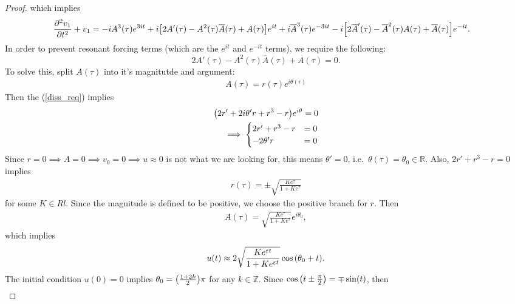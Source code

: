 \documentclass{article} %
\theoremstyle{plain}
\newcommand{\E}{\varepsilon}
\def\Rl{\mathbb{R}}
\numberwithin{equation}{section} %
\numberwithin{figure}{section} %
\numberwithin{table}{section} %
\begin{document}
\begin{proof}
    which implies
    \begin{align*}
        \frac{\partial^2 v_1}{\partial t^2} + v_1 &= -i A^3(\tau)e^{3it} + i\qty[2A'(\tau) - A^2(\tau)\overline{A}(\tau) + A(\tau)]e^{it} +i \overline{A}^3(\tau)e^{-3it} - i\qty[2\overline{A}'(\tau) - \overline{A}^2(\tau)A(\tau) + \overline{A}(\tau)]e^{-it}.
    \end{align*}
    In order to prevent resonant forcing terms (which are the $e^{it}$ and $e^{-it}$ terms), we require the following:
    \begin{equation}
        2A'(\tau) - A^2(\tau)\overline{A}(\tau) + A(\tau) = 0.
        \tag{dissonance requirement}
        \label{diss_req}
    \end{equation}
    To solve this, split $A(\tau)$ into it's magnitutde and argument:
    \begin{align*}
        A(\tau) = r(\tau)e^{i\theta(\tau)}
    \end{align*}
    Then the (\ref{diss_req}) implies
    \begin{align*}
        \qty(2r' + 2i\theta'r + r^3 - r)e^{i\theta} = 0 \\
        \implies \begin{cases}
            2r' + r^3 - r &= 0\\
            -2\theta'r &= 0
        \end{cases}
    \end{align*}
    Since $r = 0 \implies A = 0 \implies v_0 = 0 \implies u \approx 0$ is not what we are looking for, this means $\theta' = 0$, i.e.~$\theta(\tau) = \theta_0 \in \Rl$.  Also, $2r' + r^3 - r = 0$ implies
    \begin{align*}
        r(\tau) = \pm\sqrt{\frac{Ke^{\tau}}{1 + Ke^{\tau}}}
    \end{align*}
    for some $K \in Rl$.  Since the magnitude is defined to be positive, we choose the positive branch for $r$.  Then
    \begin{align*}
        A(\tau) = \sqrt{\frac{Ke^{\tau}}{1 + Ke^{\tau}}}e^{i\theta_0},
    \end{align*}
    which implies
    \begin{align*}
        u(t) \approx 2\sqrt{\frac{Ke^{\E t}}{1 + Ke^{\E t}}}\cos\qty(\theta_0 + t).
    \end{align*}
    The initial condition $u(0) = 0$ implies $\theta_0 = \qty(\frac{1 + 2k}{2})\pi$ for any $k \in \mathbb{Z}$.  Since $\cos\qty(t \pm \frac{\pi}{2}) = \mp\sin(t)$, then
    \begin{align*}

\end{align*}
\end{proof}
\end{document}
